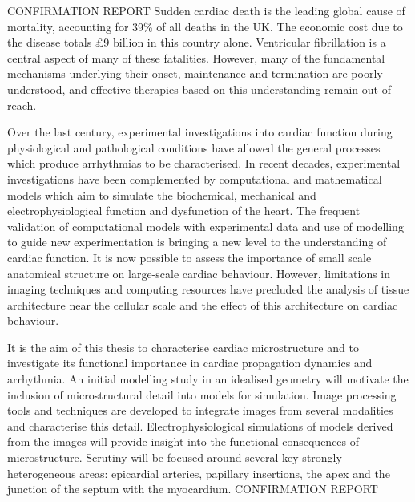 CONFIRMATION REPORT
    Sudden cardiac death is the leading global cause of mortality, accounting for 39\% of all deaths in the UK. The economic cost due to the disease totals \pounds9 billion in this country alone. Ventricular fibrillation is a central aspect of many of these fatalities. However, many of the fundamental mechanisms underlying their onset, maintenance and termination are poorly understood, and effective therapies based on this understanding remain out of reach.

  Over the last century, experimental investigations into cardiac function during physiological and pathological conditions have allowed the general processes which produce arrhythmias to be characterised. In recent decades, experimental investigations have been complemented by computational and mathematical models which aim to simulate the biochemical, mechanical and electrophysiological function and dysfunction of the heart. The frequent validation of computational models with experimental data and use of modelling to guide new experimentation is bringing a new level to the understanding of cardiac function. It is now possible to assess the importance of small scale anatomical structure on large-scale cardiac behaviour. However, limitations in imaging techniques and computing resources have precluded the analysis of tissue architecture near the cellular scale and the effect of this architecture on cardiac behaviour.

    It is the aim of this thesis to characterise cardiac microstructure and to investigate its functional importance in cardiac propagation dynamics and arrhythmia. An initial modelling study in an idealised geometry will motivate the inclusion of microstructural detail into models for simulation. Image processing tools and techniques are developed to integrate images from several modalities and characterise this detail. Electrophysiological simulations of models derived from the images will provide insight into the functional consequences of microstructure. Scrutiny will be focused around several key strongly heterogeneous areas: epicardial arteries, papillary insertions, the apex and the junction of the septum with the myocardium.
CONFIRMATION REPORT

